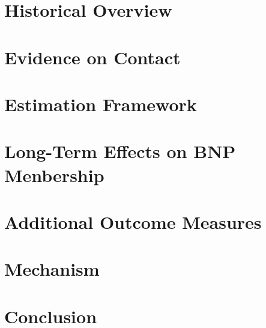 \documentclass[../root]{subfiles}
\begin{document}
    \section{Historical Overview}

    \section{Evidence on Contact}

    \section{Estimation Framework}

    \section{Long-Term Effects on BNP Menbership}

    \section{Additional Outcome Measures}

    \section{Mechanism}

    \section{Conclusion}



    \biblio
\end{document}
